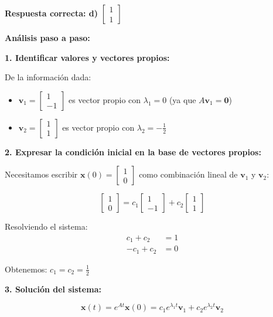 \begin{solbox}
\textbf{Respuesta correcta: d)} $\begin{bmatrix}1\\1\end{bmatrix}$

\textbf{Análisis paso a paso:}

\textbf{1. Identificar valores y vectores propios:}

De la información dada:
\begin{itemize}
    \item $\mathbf{v}_1 = \begin{bmatrix}1\\-1\end{bmatrix}$ es vector propio con $\lambda_1 = 0$ (ya que $A\mathbf{v}_1 = \mathbf{0}$)
    \item $\mathbf{v}_2 = \begin{bmatrix}1\\1\end{bmatrix}$ es vector propio con $\lambda_2 = -\frac{1}{2}$
\end{itemize}

\textbf{2. Expresar la condición inicial en la base de vectores propios:}

Necesitamos escribir $\mathbf{x}(0) = \begin{bmatrix}1\\0\end{bmatrix}$ como combinación lineal de $\mathbf{v}_1$ y $\mathbf{v}_2$:

$$\begin{bmatrix}1\\0\end{bmatrix} = c_1\begin{bmatrix}1\\-1\end{bmatrix} + c_2\begin{bmatrix}1\\1\end{bmatrix}$$

Resolviendo el sistema:
\begin{align*}
c_1 + c_2 &= 1 \\
-c_1 + c_2 &= 0
\end{align*}

Obtenemos: $c_1 = c_2 = \frac{1}{2}$

\textbf{3. Solución del sistema:}

$$\mathbf{x}(t) = e^{At}\mathbf{x}(0) = c_1 e^{\lambda_1 t}\mathbf{v}_1 + c_2 e^{\lambda_2 t}\mathbf{v}_2$$


\end{solbox}
